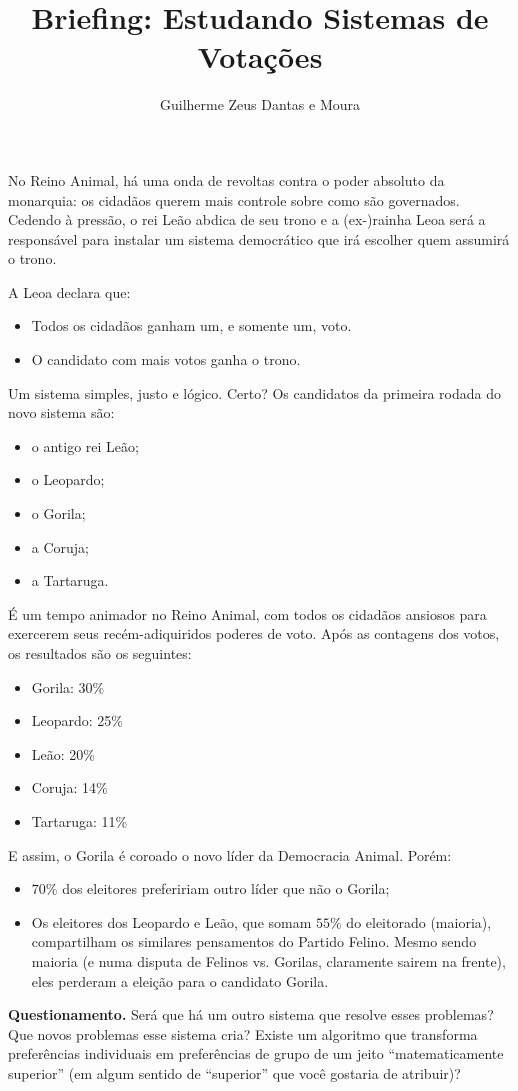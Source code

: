 \documentclass[11pt, a4paper]{article}
\title{Briefing: Estudando Sistemas de Votações}
\author{Guilherme Zeus Dantas e Moura}
\begin{document}
	
	\zeustitle

	No Reino Animal, há uma onda de revoltas contra o poder absoluto da monarquia: os cidadãos querem mais controle sobre como são governados. Cedendo à pressão, o rei Leão abdica de seu trono e a (ex-)rainha Leoa será a responsável para instalar um sistema democrático que irá escolher quem assumirá o trono.

	A Leoa declara que:
	\begin{itemize}
		\item Todos os cidadãos ganham um, e somente um, voto.
		\item O candidato com mais votos ganha o trono.
	\end{itemize}
	
	Um sistema simples, justo e lógico. Certo? Os candidatos da primeira rodada do novo sistema são:
	\begin{itemize}
		\item o antigo rei Leão;
		\item o Leopardo;
		\item o Gorila;
		\item a Coruja;
		\item a Tartaruga.
	\end{itemize}

	É um tempo animador no Reino Animal, com todos os cidadãos ansiosos para exercerem seus recém-adiquiridos poderes de voto. Após as contagens dos votos, os resultados são os seguintes:
	\begin{itemize}
		\item Gorila: 30\%
		\item Leopardo: 25\%
		\item Leão: 20\%
		\item Coruja: 14\%
		\item Tartaruga: 11\%
	\end{itemize}

	E assim, o Gorila é coroado o novo líder da Democracia Animal. Porém:
	\begin{itemize}
		\item $70\%$ dos eleitores prefeririam outro líder que não o Gorila;
		\item Os eleitores dos Leopardo e Leão, que somam $55\%$ do eleitorado (maioria), compartilham os similares pensamentos do Partido Felino. Mesmo sendo maioria (e numa disputa de Felinos vs. Gorilas, claramente sairem na frente), eles perderam a eleição para o candidato Gorila.
	\end{itemize}

	\noindent \textbf{Questionamento.} Será que há um outro sistema que resolve esses problemas? Que novos problemas esse sistema cria? Existe um algoritmo que transforma preferências individuais em preferências de grupo de um jeito ``matematicamente superior'' (em algum sentido de ``superior'' que você gostaria de atribuir)?
\end{document}
